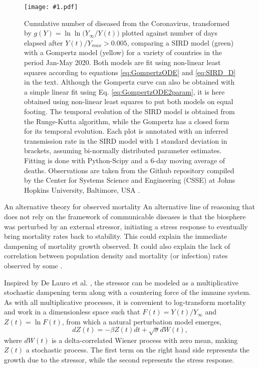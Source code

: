 \documentclass[review]{elsarticle}
\newcommand{\insertPdfFig}[3]{
  \begin{figure}[H]
  \centering
  \texttt{[image: \#1.pdf]}
  \caption{#2}
  \label{fig:#1}
  \end{figure}
}
\begin{document}
\insertPdfFig{Gompertz_vs_SIRD_lnln_infty}{Cumulative number of diseased from the Coronavirus, transformed by $g(Y)=\ln{\ln{({Y_{\infty} / Y(t))}}}$ plotted against number of days elapsed after $Y(t) / Y_{max}>0.005$, comparing a SIRD model (green) with a Gompertz model (yellow) for a variety of countries in the period Jan-May 2020. Both models are fit using non-linear least squares according to equations \ref{eq:GompertzODE} and \ref{eq:SIRD_D} in the text. Although the Gompertz curve can also be obtained with a simple linear fit using Eq. \ref{eq:GompertzODE2param}, it is here obtained using non-linear least squares to put both models on equal footing. The temporal evolution of the SIRD model is obtained from the Runge-Kutta algorithm, while the Gompertz has a closed form for its temporal evolution. Each plot is annotated with an inferred transmission rate in the SIRD model with 1 standard deviation in brackets, assuming bi-normally distributed parameter estimates. Fitting is done with Python-Scipy and a 6-day moving average of deaths. Observations are taken from the Github repository compiled by the Center for Systems Science and Engineering (CSSE) at Johns Hopkins University, Baltimore, USA \citep{dong2020interactive}.} 

\section{An alternative theory for observed mortality}
\label{seq:alt}
An alternative line of reasoning that does not rely on the framework of communicable diseases is that the biosphere was perturbed by an external stressor, initiating a stress response to eventually bring mortality rates back to stability. 
This could explain the immediate dampening of mortality growth observed. 
It could also explain the lack of correlation between population density and mortality (or infection) rates observed by some \citep{Hamidi2020,Hamidi2020a,Carozzi2020,Arpino2020,khavarian2021high,barak2021urban}.

Inspired by De Lauro et al. \cite{de2014stochastic}, the stressor can be modeled as a multiplicative stochastic dampening term along with a countering force of the immune system. 
As with all multiplicative processes, it is convenient to log-transform mortality and work in a dimensionless space such that $F(t)=Y(t)/Y_\infty$ and $Z(t)=\ln{F}(t)$, from which a natural perturbation model emerges,
\begin{equation}
\label{eq:microscopic}
dZ(t)= -\beta Z(t) dt + \sqrt{\sigma}dW(t),
\end{equation}
where $dW(t)$ is a delta-correlated Wiener process with zero mean, making $Z(t)$ a stochastic process. The first term on the right hand side represents the growth due to the stressor, while the second represents the stress response.  
\end{document}
